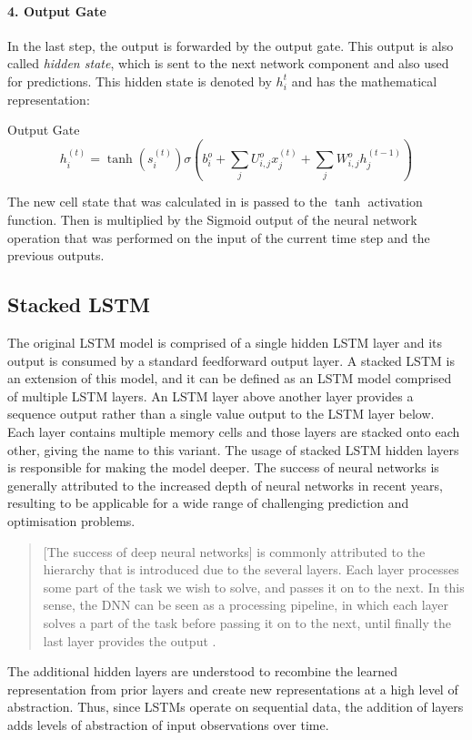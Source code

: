         \paragraph{4. Output Gate}

            In the last step, the output is forwarded by the output gate. This output is also called \emph{hidden state}, which is sent to the next network component and also used for predictions.
            This hidden state is denoted by $h_i^t$ and has the mathematical representation:

            \begin{pabox}{Output Gate}
                $$h_i^{(t)} = \tanh \left(s_i^{(t)}\right) \sigma \left(b_i^o + \sum_{j} U_{i, j}^o x_j^{(t)} + \sum_j W_{i, j}^o h_j^{(t - 1)}\right)$$
            \end{pabox}
            The new cell state that was calculated in  is passed to the $\tanh$ activation function. Then is multiplied by the Sigmoid output of the neural network operation that was performed on the input of the current time step and the previous outputs.

    \subsection{Stacked LSTM}
    \label{sec:stacked-lstm}

        The original LSTM model is comprised of a single hidden LSTM layer and its output is consumed by a standard feedforward output layer.
        A stacked LSTM is an extension of this model, and it can be defined as an LSTM model comprised of multiple LSTM layers.
        An LSTM layer above another layer provides a sequence output rather than a single value output to the LSTM layer below. Each layer contains multiple memory cells and those layers are stacked onto each other, giving the name to this variant.
        The usage of stacked LSTM hidden layers is responsible for making the model deeper.
        The success of neural networks is generally attributed to the increased depth of neural networks in recent years, resulting to be applicable for a wide range of challenging prediction and optimisation problems.

        \begin{quote}
            [The success of deep neural networks] is commonly attributed to the hierarchy that is introduced due to the several layers.
            Each layer processes some part of the task we wish to solve, and passes it on to the next.
            In this sense, the DNN can be seen as a processing pipeline, in which each layer solves a part of the task before passing it on to the next, until finally the last layer provides the output \cite{hermansTrainingAnalysingDeep2013}.
        \end{quote}
        The additional hidden layers are understood to recombine the learned representation from prior layers and create new representations at a high level of abstraction.
        Thus, since LSTMs operate on sequential data, the addition of layers adds levels of abstraction of input observations over time.
        

